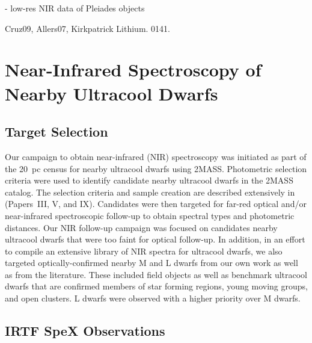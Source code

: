 \documentclass[12pt,preprint]{aastex}
\begin{document}
 \cite{Bihain10} - low-res NIR data of Pleiades objects
 
 \cite{Bowler10_HR8799}


Cruz09, Allers07, Kirkpatrick Lithium. 0141.


\section{Near-Infrared Spectroscopy of Nearby Ultracool Dwarfs}
\subsection{Target Selection}
Our campaign to obtain near-infrared (NIR) spectroscopy was initiated as part of the 20~pc census for nearby ultracool dwarfs using 2MASS. Photometric selection criteria were used to identify candidate nearby ultracool dwarfs in the 2MASS catalog. The selection criteria and sample creation are described extensively in \cite{Cruz03,Cruz07,Reid08} (Papers~III, V, and IX). Candidates were then targeted for far-red optical and/or near-infrared spectroscopic follow-up to obtain spectral types and photometric distances. Our NIR follow-up campaign was focused on candidates nearby ultracool dwarfs that were too faint for optical follow-up. In addition, in an effort to compile an extensive library of NIR spectra for ultracool dwarfs, we also targeted optically-confirmed nearby M and L dwarfs from our own work as well as from the literature. These included field objects as well as benchmark ultracool dwarfs that are confirmed members of star forming regions, young moving groups, and open clusters. L dwarfs were observed with a higher priority over M dwarfs.
                 
\subsection{IRTF SpeX Observations}
\newcommand{\spectra}{193}
\newcommand{\prism}{176} %
\newcommand{\sxd}{17}
\newcommand{\nironly}{20}
\newcommand{\dupes}{16}
\newcommand{\runs}{eight}
\newcommand{\objects}{177} %
\end{document}
